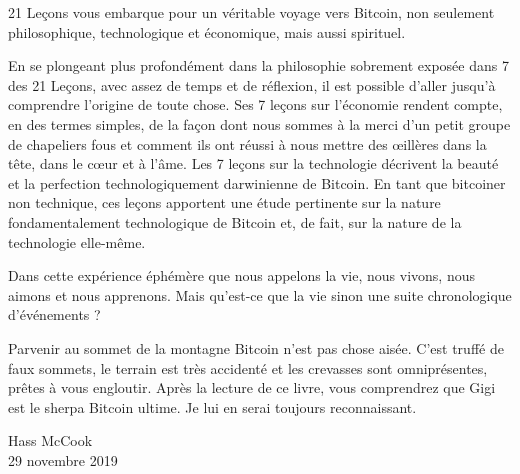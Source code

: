 21 Leçons vous embarque pour un véritable voyage vers Bitcoin, non seulement
philosophique, technologique et économique, mais aussi spirituel.

En se plongeant plus profondément dans la philosophie sobrement exposée dans 7
des 21 Leçons, avec assez de temps et de réflexion, il est possible d'aller
jusqu'à comprendre l'origine de toute chose. Ses 7 leçons sur l'économie rendent
compte, en des termes simples, de la façon dont nous sommes à la merci d'un
petit groupe de chapeliers fous et comment ils ont réussi à nous mettre des
œillères dans la tête, dans le cœur et à l'âme. Les 7 leçons sur la technologie
décrivent la beauté et la perfection technologiquement darwinienne de Bitcoin.
En tant que bitcoiner non technique, ces leçons apportent une étude pertinente
sur la nature fondamentalement technologique de Bitcoin et, de fait, sur la
nature de la technologie elle-même.

Dans cette expérience éphémère que nous appelons la vie, nous vivons, nous
aimons et nous apprenons. Mais qu'est-ce que la vie sinon une suite
chronologique d'événements ?

Parvenir au sommet de la montagne Bitcoin n'est pas chose aisée. C'est truffé de
faux sommets, le terrain est très accidenté et les crevasses sont omniprésentes,
prêtes à vous engloutir. Après la lecture de ce livre, vous comprendrez que Gigi
est le sherpa Bitcoin ultime. Je lui en serai toujours reconnaissant.

\begin{flushright}
  Hass McCook \\
  29 novembre 2019
\end{flushright}
